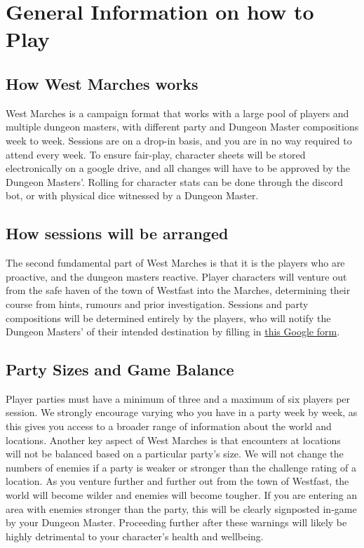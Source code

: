 \chapter{General Information on how to Play}
\section{How West Marches works}
West Marches is a campaign format that works with a large pool of players and multiple dungeon masters, with different party and Dungeon Master compositions week to week.\newline
Sessions are on a drop-in basis, and you are in no way required to attend every week.\newline
To ensure fair-play, character sheets will be stored electronically on a google drive, and all changes will have to be approved by the Dungeon Masters’. Rolling for character stats can be done through the discord bot, or with physical dice witnessed by a Dungeon Master.
\section{How sessions will be arranged}
The second fundamental part of West Marches is that it is the players who are proactive, and the dungeon masters reactive.\newline
Player characters will venture out from the safe haven of the town of Westfast into the Marches, determining their course from hints, rumours and prior investigation.\newline
Sessions and party compositions will be determined entirely by the players, who will notify the Dungeon Masters’ of their intended destination by filling in \href{ https://goo.gl/forms/rzNrDHNviYnMTSXA2}{this Google form}.
\section{Party Sizes and Game Balance}
Player parties must have a minimum of three and a maximum of six players per session. We strongly encourage varying who you have in a party week by week, as this gives you access to a broader range of information about the world and locations. \newline
Another key aspect of West Marches is that encounters at locations will not be balanced based on a particular party’s size. We will not change the numbers of enemies if a party is weaker or stronger than the challenge rating of a location.\newline
As you venture further and further out from the town of Westfast, the world will become wilder and enemies will become tougher. If you are entering an area with enemies stronger than the party, this will be clearly signposted in-game by your Dungeon Master. Proceeding further after these warnings will likely be highly detrimental to your character’s health and wellbeing.  
